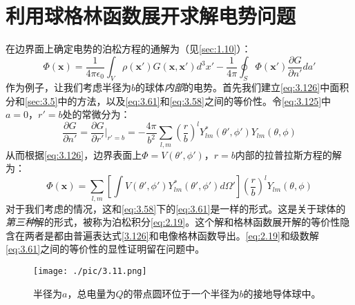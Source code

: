\documentclass[12pt]{book}
\numberwithin{equation}{chapter}
\numberwithin{figure}{chapter}
\numberwithin{footnote}{page}
\begin{document}
\section{利用球格林函数展开求解电势问题}\label{sec:3.10}

在边界面上确定电势的泊松方程的通解为（见\autoref{sec:1.10}）：
\begin{equation}\label{eq:3.126}
    \Phi(\mathbf{x})=\frac{1}{4\pi\epsilon_0}\int_V \rho(\mathbf{x'})G(\mathbf{x},\mathbf{x'})d^3x'-\frac{1}{4\pi}\oint_S \Phi(\mathbf{x'})\frac{\partial G}{\partial n'}da'
\end{equation}
作为例子，让我们考虑半径为$b$的球体\textit{内部}的电势。首先我们建立\autoref{eq:3.126}中面积分和\autoref{sec:3.5}中的方法，以及\autoref{eq:3.61}和\autoref{eq:3.58}之间的等价性。令\autoref{eq:3.125}中$a=0$，$r'=b$处的常微分为：
\begin{equation}\label{eq:3.127}
    \frac{\partial G}{\partial n'}=\frac{\partial G}{\partial r'}|_{r'=b}=-\frac{4\pi}{b^2}\sum_{l,m}(\frac{r}{b})^l Y_{lm}^*(\theta',\phi')Y_{lm}(\theta,\phi)
\end{equation}
从而根据\autoref{eq:3.126}，边界表面上$\Phi=V(\theta',\phi')$，$r=b$内部的拉普拉斯方程的解为：
\begin{equation}\label{eq:3.128}
    \Phi(\mathbf{x})=\sum_{l,m}[\int V(\theta',\phi')Y_{lm}^*(\theta',\phi')d\Omega'](\frac{r}{b})^l Y_{lm}(\theta,\phi)
\end{equation}
对于我们考虑的情况，这和\autoref{eq:3.58}下的\autoref{eq:3.61}是一样的形式。这是关于球体的\textit{第三种}解的形式，被称为泊松积分\autoref{eq:2.19}。这个解和格林函数展开解的等价性隐含在两者是都由普遍表达式\autoref{3.126}和电像格林函数导出。\autoref{eq:2.19}和级数解\autoref{eq:3.61}之间的等价性的显性证明留在问题中。

\begin{figure}[!ht]
    \centering
    \texttt{[image: ./pic/3.11.png]}
    \captionsetup{justification=raggedright, singlelinecheck=false}
    \caption{半径为$a$，总电量为$Q$的带点圆环位于一个半径为$b$的接地导体球中。}
    \label{fig:3.11}
\end{figure}
\end{document}
